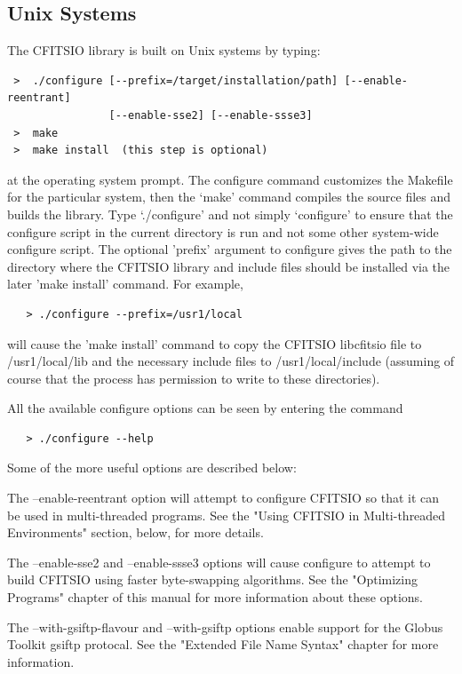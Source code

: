 \documentclass[11pt]{book}
\begin{document}
\subsection{Unix Systems}

The CFITSIO library is built on Unix systems by typing:

\begin{verbatim}
 >  ./configure [--prefix=/target/installation/path] [--enable-reentrant]
                [--enable-sse2] [--enable-ssse3]
 >  make
 >  make install  (this step is optional)
\end{verbatim}
at the operating system prompt.  The configure command customizes the
Makefile for the particular system, then the `make' command compiles the
source files and builds the library.  Type `./configure' and not simply
`configure' to ensure that the configure script in the current directory
is run and not some other system-wide configure script.  The optional
'prefix' argument to configure gives the path to the directory where
the CFITSIO library and include files should be installed via the later
'make install' command. For example,

\begin{verbatim}
   > ./configure --prefix=/usr1/local
\end{verbatim}
will cause the 'make install' command to copy the CFITSIO libcfitsio file
to /usr1/local/lib and the necessary include files to /usr1/local/include
(assuming of course that the  process has permission to write to these
directories).

All the available configure options can be seen by entering the command

\begin{verbatim}
   > ./configure --help
\end{verbatim}
Some of the more useful options are described below:

The --enable-reentrant option will attempt to configure CFITSIO
so that it can be used in multi-threaded programs.  See the
"Using CFITSIO in Multi-threaded Environments" section, below, for more details.

The --enable-sse2 and --enable-ssse3 options will cause configure to
attempt to build CFITSIO using faster byte-swapping algorithms.
See the "Optimizing Programs" chapter of this manual for
more information about these options.

The --with-gsiftp-flavour and --with-gsiftp options enable support for the Globus
Toolkit gsiftp protocal.  See the "Extended File Name Syntax" chapter for more
information.
\end{document}
